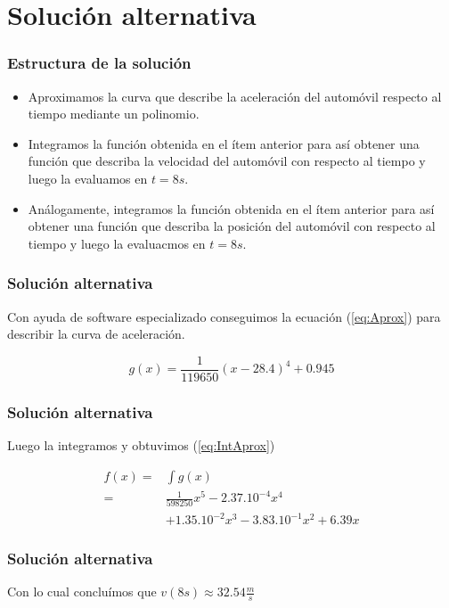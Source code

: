 \documentclass[11pt]{beamer}
\begin{document}
	\section{Solución alternativa}
	\begin{frame}
		\frametitle{Estructura de la solución}
		
		\begin{itemize}
			\item Aproximamos la curva que describe la aceleración del automóvil respecto al tiempo mediante un polinomio.
			\item Integramos la función obtenida en el ítem anterior para así obtener una función que describa la velocidad del automóvil con respecto al tiempo y luego la evaluamos en $t = 8s$.
			\item Análogamente, integramos la función obtenida en el ítem anterior para así obtener una función que describa la posición del automóvil con respecto al tiempo y luego la evaluacmos en $t = 8s$.
		\end{itemize}		
	\end{frame}

	\begin{frame}
		\frametitle{Solución alternativa}
		Con ayuda de software especializado conseguimos la ecuación (\ref{eq:Aprox}) para describir la curva de aceleración.
		
		\begin{equation} \label{eq:Aprox}
		g(x) = \frac{1}{119650} (x-28.4)^4 + 0.945
		\end{equation}
	\end{frame}

	\begin{frame}
		\frametitle{Solución alternativa}
		Luego la integramos y obtuvimos (\ref{eq:IntAprox})
		
		\begin{align} \label{eq:IntAprox}
		f(x) =& \int g(x)\\
			 =& \frac{1}{598250} x^{5} - 2.37\text{.}10^{-4} x^4 \nonumber\\
			 &+ 1.35\text{.}10^{-2} x^3 - 3.83\text{.}10^{-1} x^2 + 6.39 x \nonumber
		\end{align}
	\end{frame}

	\begin{frame}
		\frametitle{Solución alternativa}
		
		Con lo cual concluímos que $v(8s) \approx 32.54\frac{m}{s}$
	\end{frame}
\end{document}
